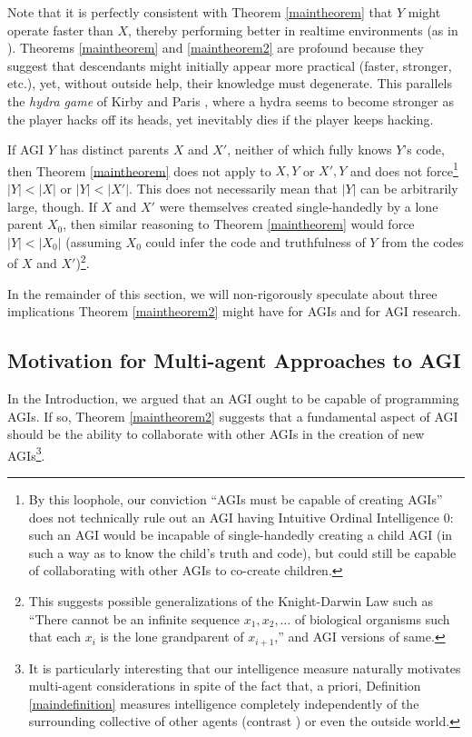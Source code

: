\documentclass[runningheads]{llncs}
\begin{document}
Note that it is perfectly consistent with
Theorem \ref{maintheorem} that $Y$ might operate faster
than $X$, thereby performing better in realtime environments (as in \cite{gavane}).
Theorems \ref{maintheorem} and \ref{maintheorem2} are profound because
they suggest that descendants might initially appear more practical
(faster, stronger, etc.),
yet, without outside help, their knowledge must degenerate.
This parallels the \emph{hydra game} of
Kirby and Paris \cite{kirby1982accessible}, where a hydra
seems to become stronger as the player hacks off its heads, yet
inevitably dies if the player keeps hacking.

If AGI $Y$ has distinct parents $X$ and $X'$, neither of which fully knows
$Y$'s code, then Theorem \ref{maintheorem} does not apply to $X,Y$ or $X',Y$ and
does not force\footnote{By this loophole, our conviction ``AGIs must be capable of creating
AGIs'' does not technically rule out an AGI having Intuitive Ordinal Intelligence $0$:
such an AGI would be incapable of single-handedly creating a child AGI (in such a way as
to know the child's truth and code), but could still be capable of collaborating with
other AGIs to co-create
children.} $|Y|<|X|$ or $|Y|<|X'|$. This does not necessarily mean that
$|Y|$ can be arbitrarily large, though. If $X$ and $X'$ were themselves
created single-handedly by a lone parent $X_0$, then similar
reasoning to Theorem \ref{maintheorem} would force $|Y|<|X_0|$ (assuming $X_0$
could infer the code and truthfulness of $Y$ from the codes of $X$ and $X'$)\footnote{This
suggests possible generalizations of the Knight-Darwin Law such as ``There cannot be
an infinite sequence $x_1,x_2,\ldots$ of biological organisms such that each $x_i$
is the lone grandparent of $x_{i+1}$,'' and AGI versions of same.}.

In the remainder of this section, we will non-rigorously speculate about three implications
Theorem \ref{maintheorem2} might have for AGIs and for AGI research.


\subsection{Motivation for Multi-agent Approaches to AGI}

In the Introduction, we argued that an AGI ought to be
capable of programming AGIs. If so, Theorem \ref{maintheorem2} suggests
that a fundamental aspect of AGI should be the ability to collaborate with other
AGIs in the creation of new AGIs\footnote{It is particularly interesting that our
intelligence measure naturally motivates multi-agent considerations in spite of
the fact that, a priori, Definition \ref{maindefinition} measures intelligence
completely independently of the surrounding collective of other agents
(contrast \cite{hernandez2011more}) or even the outside world.}.
\end{document}
